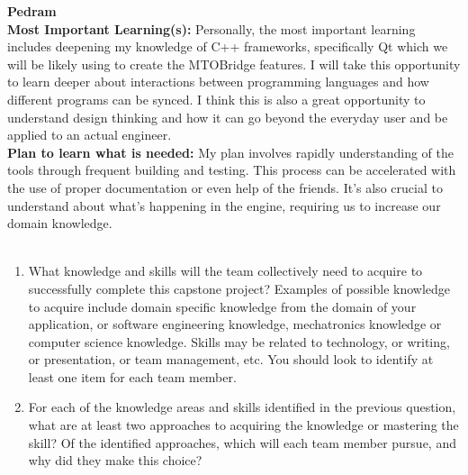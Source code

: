 \documentclass[12pt]{article}
\begin{document}
\noindent\textbf{Pedram}\\
\textbf{Most Important Learning(s):} Personally, the most important learning includes deepening my knowledge of C++ frameworks, specifically Qt which we will be likely using to create the MTOBridge features. I will take this opportunity to learn deeper about interactions between programming languages and how different programs can be synced. I think this is also a great opportunity to understand design thinking and how it can go beyond the everyday user and be applied to an actual engineer. \\
\textbf{Plan to learn what is needed:} My plan involves rapidly understanding of the tools through frequent building and testing. This process can be accelerated with the use of proper documentation or even help of the friends. It’s also crucial to understand about what’s happening in the engine, requiring us to increase our domain knowledge. \\\\

\begin{enumerate}
  \item What knowledge and skills will the team collectively need to acquire to
  successfully complete this capstone project?  Examples of possible knowledge
  to acquire include domain specific knowledge from the domain of your
  application, or software engineering knowledge, mechatronics knowledge or
  computer science knowledge.  Skills may be related to technology, or writing,
  or presentation, or team management, etc.  You should look to identify at
  least one item for each team member.
  \item For each of the knowledge areas and skills identified in the previous
  question, what are at least two approaches to acquiring the knowledge or
  mastering the skill?  Of the identified approaches, which will each team
  member pursue, and why did they make this choice?
\end{enumerate}
\end{document}
